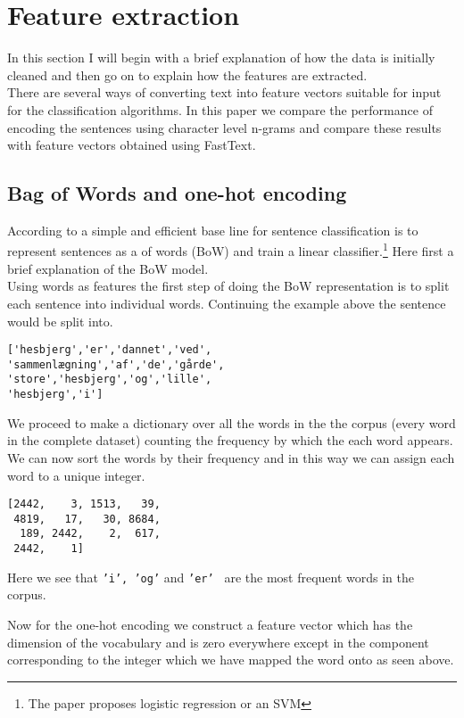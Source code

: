 \section{Feature extraction}

In this section I will begin with a brief explanation of how the data is initially cleaned and then go on to explain how the features are extracted.\\

There are several ways of converting text into feature vectors suitable for input for the classification algorithms.
In this paper we compare the performance of encoding the sentences using character level n-grams and compare these results with feature vectors obtained using FastText.

\subsection{Bag of Words and one-hot encoding}
According to \cite{BagOfTricks} a simple and efficient base line for sentence classification is to represent sentences as a of words (BoW) and train a linear classifier.\footnote{The paper proposes logistic regression or an SVM} Here first a brief explanation of the BoW model. \\

Using words as features the first step of doing the BoW representation is to split each sentence into individual words. Continuing the example above the sentence would be split into.

\begin{verbatim}
['hesbjerg','er','dannet','ved',
'sammenlægning','af','de','gårde',
'store','hesbjerg','og','lille',
'hesbjerg','i']
\end{verbatim}

We proceed to make a dictionary over all the words in the the corpus (every word in the complete dataset) counting the frequency by which the each word appears. We can now sort the words by their frequency and in this way we can assign each word to a unique integer.

\begin{verbatim}
[2442,    3, 1513,   39,
 4819,   17,   30, 8684,
  189, 2442,    2,  617,
 2442,    1]
\end{verbatim}

Here we see that {\tt 'i', 'og'} and {\tt 'er' } are the most frequent words in the corpus.

Now for the one-hot encoding we construct a feature vector which has the dimension of the vocabulary and is zero everywhere except in the component corresponding to the integer which we have mapped the word onto as seen above. \\

